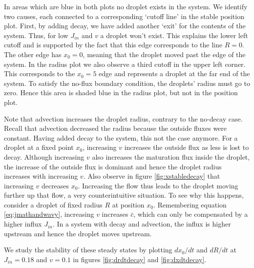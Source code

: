 \documentclass{Dissertate}
\begin{document}
In areas which are blue in both plots no droplet exists in the system.
We identify two causes, each connected to a corresponding `cutoff line'
in the stable position plot. First, by adding decay, we have added
another `exit' for the contents of the system. Thus, for low \(J_{in}\)
and \(v\) a droplet won't exist. This explains the lower left cutoff and
is supported by the fact that this edge corresponds to the line \(R=0\).
The other edge has \(x_0=0\), meaning that the droplet moved past the
edge of the system. In the radius plot we also observe a third cutoff in
the upper left corner. This corresponds to the \(x_0=5\) edge and
represents a droplet at the far end of the system. To satisfy the
no-flux boundary condition, the droplets' radius must go to zero. Hence
this area is shaded blue in the radius plot, but not in the position
plot.

Note that advection increases the droplet radius, contrary to the
no-decay case. Recall that advection decreased the radius because the
outside fluxes were constant. Having added decay to the system, this not
the case anymore. For a droplet at a fixed point \(x_0\), increasing
\(v\) increases the outside flux as less is lost to decay. Although
increasing \(v\) also increases the maturation flux inside the droplet,
the increase of the outside flux is dominant and hence the droplet
radius increases with increasing \(v\). Also observe in figure
\ref{fig:xstabledecay} that increasing \(v\) decreases \(x_0\).
Increasing the flow thus leads to the droplet moving further up that
flow, a very counterintuitive situation. To see why this happens,
consider a droplet of fixed radius \(R\) at position \(x_0\).
Remembering equation \ref{eq:jmathandwavy}, increasing \(v\)
increases \(\bar{c}\), which can only be compensated by a higher influx
\(J_{in}\). In a system with decay and advection, the influx is higher
upstream and hence the droplet moves upstream.

We study the stability of these steady states by plotting \(dx_0/dt\)
and \(dR/dt\) at \(J_{in} = 0.18\) and \(v=0.1\) in figures
\ref{fig:drdtdecay} and \ref{fig:dxdtdecay}.
\end{document}
